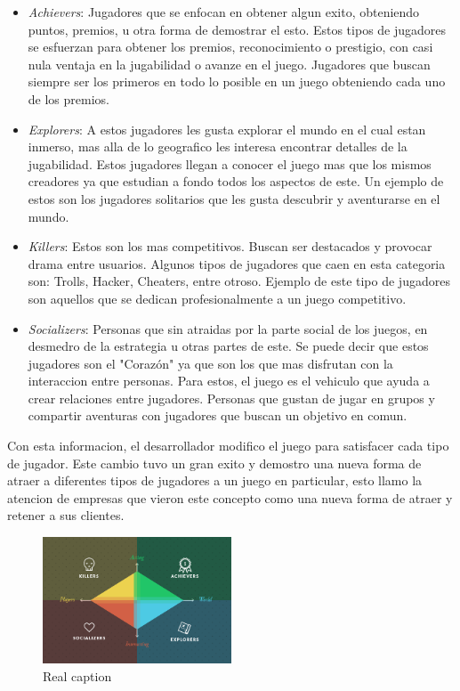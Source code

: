 \begin{itemize}

\item \emph{Achievers}: Jugadores que se enfocan en obtener algun exito, obteniendo puntos, premios,
 u otra forma de demostrar el esto. Estos tipos de jugadores se esfuerzan para obtener los premios,
reconocimiento o prestigio, con casi nula ventaja en la jugabilidad o avanze en el juego. Jugadores que
buscan siempre ser los primeros en todo lo posible en un juego obteniendo cada uno de los premios. 

\item \emph{Explorers}: A estos jugadores les gusta explorar el mundo en el cual estan inmerso, mas alla
de lo geografico les interesa encontrar detalles de la jugabilidad. Estos jugadores llegan a conocer
el juego mas que los mismos creadores ya que estudian a fondo todos los aspectos de este. Un
ejemplo de estos son los jugadores solitarios que les gusta descubrir y aventurarse en el mundo.

\item \emph{Killers}: Estos son los mas competitivos. Buscan ser destacados y provocar drama entre usuarios.
Algunos tipos de jugadores que caen en esta categoria son: Trolls, Hacker, Cheaters, entre otroso. Ejemplo 
de este tipo de jugadores son aquellos que se dedican profesionalmente a un juego competitivo.

\item \emph{Socializers}: Personas que sin atraidas por la parte social de los juegos, en desmedro de
la estrategia u otras partes de este. Se puede decir que estos jugadores son el "Corazón" ya que
son los que mas disfrutan con la interaccion entre personas. Para estos, el juego es el vehiculo
que ayuda a crear relaciones entre jugadores. Personas que gustan de jugar en grupos y compartir 
aventuras con jugadores que buscan un objetivo en comun. 

\end{itemize}

Con esta informacion, el desarrollador modifico el juego para satisfacer cada tipo de jugador.
Este cambio tuvo un gran exito y demostro una nueva forma de atraer a diferentes tipos de jugadores a un
juego en particular, esto llamo la atencion de empresas que vieron este concepto como una nueva 
forma de atraer y retener a sus clientes.

\begin{figure}[!htb]
  \centering
  \includegraphics[width=0.5\textwidth]{images/TypeOfPlayersBartle.png}
  \caption[Caption for LOF]{Real caption\footnotemark}
  \label{fig:Players}
\end{figure}

